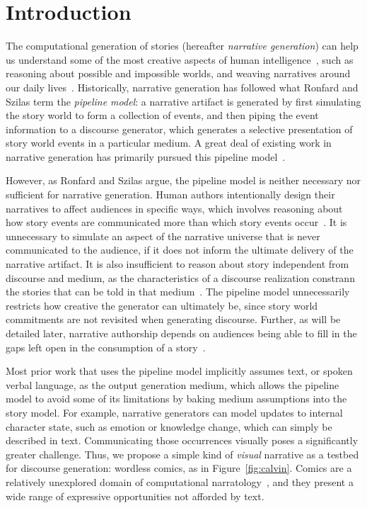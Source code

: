 \section{Introduction}

The computational generation of stories (hereafter {\em narrative
generation}) can help us understand some of the most creative aspects of
human intelligence~\cite{boyd2009origin}, such as reasoning about possible
and impossible worlds, and weaving narratives around our daily
lives~\cite{herman2013storytelling}.  Historically, narrative generation
has followed what Ronfard and Szilas \cite{ronfard2014story} term the
\emph{pipeline model}: a narrative artifact is generated by
first simulating the story world to form a collection of events, and then piping
the event information to a discourse generator, which generates a
selective presentation of story world events in a particular medium. A great
deal of existing work in narrative generation has primarily pursued this
pipeline model~\cite{gervas2009computational}. 

However, as Ronfard and Szilas argue, the pipeline model is neither
necessary nor sufficient for narrative generation.  Human authors
intentionally design their narratives to affect audiences in specific ways,
which involves reasoning about how story events are communicated more than
which story events occur~\cite{chatman1980story,bordwell1989making}. It is
unnecessary to simulate an aspect of the narrative universe that is never
communicated to the audience, if it does not inform the ultimate delivery
of the narrative artifact. It is also insufficient to reason about story
independent from discourse and medium, as the characteristics of a
discourse realization constrann the stories that can be told in that
medium~\cite{herman2004toward}.  The pipeline model unnecessarily restricts
how creative the generator can ultimately be, since story world commitments
are not revisited when generating discourse. Further, as will be detailed
later, narrative authorship depends on audiences being able to fill in the
gaps left open in the consumption of a
story~\cite{saraceni2016relatedness,magliano2016filling}.

Most prior work that uses the pipeline model implicitly assumes text, or
spoken verbal language, as the output generation medium, which allows the
pipeline model to avoid some of its limitations by baking medium
assumptions into the story model. For example, narrative generators can
model updates to internal character state, such as emotion or knowledge
change, which can simply be described in text. Communicating those
occurrences visually poses a significantly greater challenge.
Thus, we propose a simple kind of {\em visual} narrative as a testbed for
discourse generation: wordless comics, as in Figure~\ref{fig:calvin}. 
Comics are a relatively unexplored
domain of computational narratology~\cite{mani2012computational}, and they
present a wide range of expressive opportunities not afforded by text.

